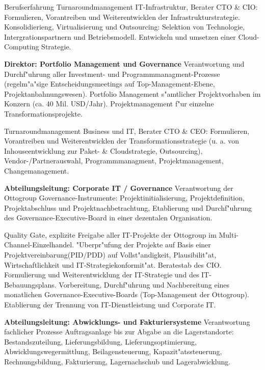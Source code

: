 \begin{rubric}{Berufserfahrung}
Turnaroundmanagement IT-Infrastruktur, Berater CTO \& CIO: Formulieren, Vorantreiben und Weiterentwicklen der Infrastrukturstrategie. Konsolidierieng, Virtualisierung und Outsourcing: Selektion von Technologie, Intergrationspartnern und Betriebsmodell. Entwickeln und umsetzen einer Cloud-Computing Strategie.

\entry*[10/2011 - 03/2013] \textbf{Direktor: Portfolio Management und Governance}\newline
{} 
Verantwortung und Durchf"uhrung aller Investment- und Programmmanagment-Prozesse (regelm"a"sige Entscheidungsmeetings auf Top-Management-Ebene, Projektanbahnungswesen). Portfolio Management s"amtlicher Projektvorhaben im Konzern (ca. 40 Mil. USD/Jahr). Projektmanagement f"ur einzelne Transformationsprojekte.

Turnaroundmanagement Business und IT, Berater CTO \& CEO: Formulieren, Vorantreiben und Weiterentwicklen der Transformationsstrategie (u. a. von Inhouseentwicklung zur Paket- \& Cloudstrategie, Outsourcing), Vendor-/Partnerauswahl, Programmmanagment, Projektmanagement, Changemanagement.\newline

\entry*[08/2009 - 10/2011] \textbf{Abteilungsleitung: Corporate IT / Governance}\newline
{} 
Verantwortung der Ottogroup Governance-Instrumente: Projektinitialisierung, Projektdefinition, Projektabschluss und Projektnachbetrachtung, Etablierung und Durchf"uhrung des Governance-Executive-Board in einer dezentalen Organisation.\axelvspace

Quality Gate, explizite Freigabe aller IT-Projekte der Ottogroup im Multi-Channel-Einzelhandel. "Uberpr"ufung der Projekte auf Basis einer Projektvereinbarung(PID/PDD) auf Vollst"andigkeit, Plausibilit"at, Wirtschaftlichkeit und IT-Strategiekonformit"at. Beratestab des CIO. Formulierung und Weiterentwicklung der IT-Strategie und des IT-Bebauungsplans. Vorbereitung, Durchf"uhrung und Nachbereitung eines monatlichen Governance-Executive-Boards (Top-Management der Ottogroup). Etablierung der Trennung von IT-Dienstleistung und Corporate IT.

\entry*[08/2006 - 07/2009] \textbf{Abteilungsleitung: Abwicklungs- und Fakturiersysteme}\newline
{} 
Verantwortung fachlicher Prozesse Auftragsanlage bis zur Abgabe an die Lagerstandorte: Bestandszuteilung,
Lieferungsbildung, Lieferungsoptimierung, Abwicklungswegermittlung, Beilagensteuerung, Kapazit"atssteuerung, Rechnungsbildung, Fakturierung, Lagernachschub und Lagerabwicklung.\axelvspace


\end{rubric}
